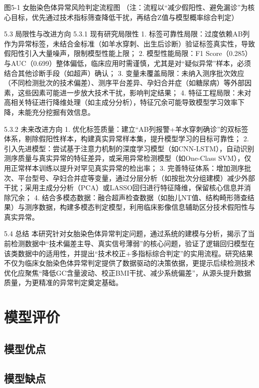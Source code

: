 \documentclass[withoutpreface,bwprint]{cumcmthesis} %
\begin{document}
图5-1 女胎染色体异常风险判定流程图  
（注：流程以“减少假阳性、避免漏诊”为核心目标，优先通过技术指标筛查降低干扰，再结合Z值与模型概率综合判定）


5.3 局限性与改进方向
5.3.1 现有研究局限性
1. 标签可靠性局限：过度依赖AB列作为异常标签，未结合金标准（如羊水穿刺、出生后诊断）验证标签真实性，导致假阳性引入大量噪声，限制模型性能上限；  
2. 模型性能局限：F1 Score（0.285）与AUC（0.699）整体偏低，临床应用时需谨慎，尤其是对“疑似异常”样本，必须结合其他诊断手段（如超声）确认；  
3. 变量未覆盖局限：未纳入测序批次效应（不同检测批次的技术偏差）、测序平台差异、孕妇合并症（如糖尿病）等外部因素，这些因素可能进一步放大技术干扰，影响判定结果；  
4. 特征工程局限：未对高相关特征进行降维处理（如主成分分析），特征冗余可能导致模型学习效率下降，未能充分挖掘有效信息。

5.3.2 未来改进方向
1. 优化标签质量：建立“AB列报警+羊水穿刺确诊”的双标签体系，剔除假阳性样本，构建真实异常样本集，提升模型学习的目标可靠性；  
2. 引入先进模型：尝试基于注意力机制的深度学习模型（如CNN-LSTM），自动识别测序质量与真实异常的特征差异，或采用异常检测模型（如One-Class SVM），仅用正常样本训练以提升对罕见真实异常的检出率；  
3. 完善特征体系：增加测序批次、平台型号、孕妇合并症等变量，通过分层分析（如按批次分组建模）减少外部干扰；采用主成分分析（PCA）或LASSO回归进行特征降维，保留核心信息并消除冗余；  
4. 结合多模态数据：融合超声检查数据（如胎儿NT值、结构畸形筛查结果）与测序数据，构建多模态判定模型，利用临床影像信息辅助区分技术假阳性与真实异常。


5.4 总结
本研究针对女胎染色体异常判定问题，通过系统的建模与分析，揭示了当前检测数据中“技术偏差主导、真实信号薄弱”的核心问题，验证了逻辑回归模型在该类数据中的适用性，并提出“技术校正+多指标综合判定”的实用流程。研究结果不仅为临床女胎染色体异常判定提供了数据驱动的决策依据，更提示后续检测技术优化应聚焦“降低GC含量波动、校正BMI干扰、减少系统偏差”，从源头提升数据质量，为更精准的异常判定奠定基础。




\section{模型评价}
\subsection{模型优点}

\subsection{模型缺点}




\begin{appendices}
\end{appendices}
\end{document}
